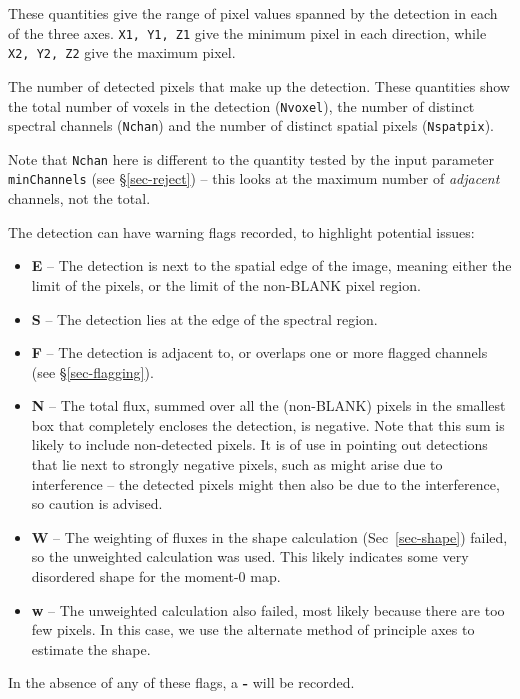
These quantities give the range of pixel values spanned by the
detection in each of the three axes. \texttt{X1, Y1, Z1} give the
minimum pixel in each direction, while \texttt{X2, Y2, Z2} give the
maximum pixel.


The number of detected pixels that make up the detection. These
quantities show the total number of voxels in the detection
(\texttt{Nvoxel}), the number of distinct spectral channels
(\texttt{Nchan}) and the number of distinct spatial pixels
(\texttt{Nspatpix}). 

Note that \texttt{Nchan} here is different to the quantity tested by
the input parameter \texttt{minChannels} (see \S\ref{sec-reject}) --
this looks at the maximum number of \textit{adjacent} channels, not
the total.

\label{sec-flags}

The detection can have warning flags recorded, to highlight potential
issues:
\begin{itemize}
\item \textbf{E} -- The detection is next to the spatial edge of the
  image, meaning either the limit of the pixels, or the limit of the
  non-BLANK pixel region.
\item \textbf{S} -- The detection lies at the edge of the spectral
  region.
\item \textbf{F} -- The detection is adjacent to, or overlaps one or
  more flagged channels (see \S\ref{sec-flagging}).
\item \textbf{N} -- The total flux, summed over all the (non-BLANK)
  pixels in the smallest box that completely encloses the detection,
  is negative. Note that this sum is likely to include non-detected
  pixels. It is of use in pointing out detections that lie next to
  strongly negative pixels, such as might arise due to interference --
  the detected pixels might then also be due to the interference, so
  caution is advised.
\item \textbf{W} -- The weighting of fluxes in the shape calculation
  (Sec~\ref{sec-shape}) failed, so the unweighted calculation was
  used. This likely indicates some very disordered shape for the
  moment-0 map.
\item \textbf{w} -- The unweighted calculation also failed, most
  likely because there are too few pixels. In this case, we use the
  alternate method of principle axes to estimate the shape.
\end{itemize}
In the absence of any of these flags, a \textbf{-} will be recorded.


